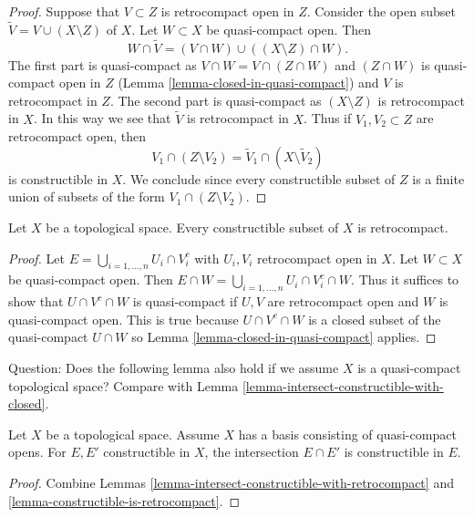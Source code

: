 \begin{proof}
Suppose that $V \subset Z$ is retrocompact open in $Z$. Consider the open
subset $\tilde V = V \cup (X \setminus Z)$ of $X$. Let $W \subset X$ be
quasi-compact open. Then
$$
W \cap \tilde V =
\left(V \cap W\right) \cup \left((X \setminus Z) \cap W\right).
$$
The first part is quasi-compact as $V \cap W = V \cap (Z \cap W)$ and
$(Z \cap W)$ is quasi-compact open in $Z$
(Lemma \ref{lemma-closed-in-quasi-compact}) and $V$ is retrocompact in $Z$.
The second part is quasi-compact as $(X \setminus Z)$ is retrocompact in $X$.
In this way we see that $\tilde V$ is retrocompact in $X$.
Thus if $V_1, V_2 \subset Z$ are retrocompact open, then
$$
V_1 \cap (Z \setminus V_2) = \tilde V_1 \cap (X \setminus \tilde V_2)
$$
is constructible in $X$. We conclude since every constructible subset of $Z$
is a finite union of subsets of the form $V_1 \cap (Z \setminus V_2)$.
\end{proof}

\begin{lemma}
\label{lemma-constructible-is-retrocompact}
Let $X$ be a topological space. Every constructible
subset of $X$ is retrocompact.
\end{lemma}

\begin{proof}
Let $E = \bigcup_{i = 1, \ldots, n} U_i \cap V_i^c$ with $U_i, V_i$
retrocompact open in $X$. Let $W \subset X$ be quasi-compact open.
Then $E \cap W = \bigcup_{i = 1, \ldots, n} U_i \cap V_i^c \cap W$.
Thus it suffices to show that $U \cap V^c \cap W$ is quasi-compact
if $U, V$ are retrocompact open and $W$ is quasi-compact
open. This is true because $U \cap V^c \cap W$ is a closed
subset of the quasi-compact $U \cap W$ so
Lemma \ref{lemma-closed-in-quasi-compact}
applies.
\end{proof}

\noindent
Question: Does the following lemma also hold if we assume $X$ is a
quasi-compact topological space? Compare with
Lemma \ref{lemma-intersect-constructible-with-closed}.

\begin{lemma}
\label{lemma-intersect-constructible-with-constructible}
Let $X$ be a topological space. Assume
$X$ has a basis consisting of quasi-compact opens.
For $E, E'$ constructible in $X$, the intersection
$E \cap E'$ is constructible in $E$.
\end{lemma}

\begin{proof}
Combine Lemmas \ref{lemma-intersect-constructible-with-retrocompact} and
\ref{lemma-constructible-is-retrocompact}.
\end{proof}


